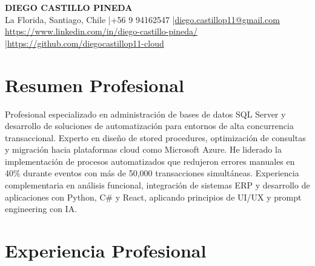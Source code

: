 \documentclass[11pt,letterpaper]{article}
\begin{document}
\begin{center}
{\fontsize{16}{19}\selectfont\textbf{\MakeUppercase{Diego Castillo Pineda}}}\\[4pt]
{\small La Florida, Santiago, Chile \quad|\quad +56 9 94162547 \quad|\quad \href{mailto:diego.castillop11@gmail.com}{diego.castillop11@gmail.com}\\
\href{https://https://www.linkedin.com/in/diego-castillo-pineda/}{https://www.linkedin.com/in/diego-castillo-pineda/} \quad|\quad \href{https://https://github.com/diegocastillop11-cloud}{https://github.com/diegocastillop11-cloud}}
\end{center}

\section{Resumen Profesional}
Profesional especializado en administración de bases de datos SQL Server y desarrollo de soluciones de automatización para entornos de alta concurrencia transaccional. Experto en diseño de stored procedures, optimización de consultas y migración hacia plataformas cloud como Microsoft Azure. He liderado la implementación de procesos automatizados que redujeron errores manuales en 40\% durante eventos con más de 50,000 transacciones simultáneas. Experiencia complementaria en análisis funcional, integración de sistemas ERP y desarrollo de aplicaciones con Python, C\# y React, aplicando principios de UI/UX y prompt engineering con IA.

\section{Experiencia Profesional}
\end{document}
